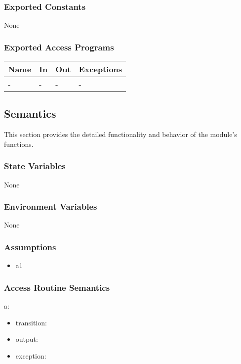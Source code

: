 \documentclass[12pt, titlepage]{article}
\begin{document}
\subsubsection{Exported Constants}

None

\subsubsection{Exported Access Programs}

\begin{center}
\begin{tabular}{p{2cm} p{4cm} p{4cm} p{2cm}}
\hline
\textbf{Name} & \textbf{In} & \textbf{Out} & \textbf{Exceptions} \\
\hline
- & - & - & - \\
\hline
\end{tabular}
\end{center}

\subsection{Semantics}

This section provides the detailed functionality and behavior of the module’s
functions.

\subsubsection{State Variables}

None

\subsubsection{Environment Variables}

None

\subsubsection{Assumptions}

\begin{itemize}
\item a1
\end{itemize}

\subsubsection{Access Routine Semantics}

\noindent a:
\begin{itemize}
\item transition: 
\item output: 
\item exception: 
\end{itemize}
\end{document}
